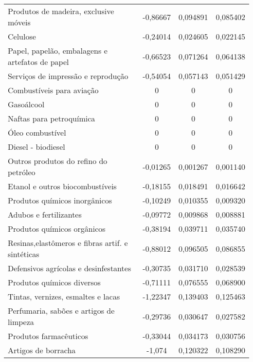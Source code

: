 \begin{apendicesenv}
\begin{small}
\begin{center}
\begin{longtable}{m{8cm}ccc}
				Produtos de madeira, exclusive móveis              & -0,86667 & 0,094891 & 0,085402 \\
				Celulose                                           & -0,24014 & 0,024605 & 0,022145 \\
				Papel, papelão, embalagens e artefatos de papel    & -0,66523 & 0,071264 & 0,064138 \\
				Serviços de impressão e reprodução                 & -0,54054 & 0,057143 & 0,051429 \\
				Combustíveis para aviação                          & 0 & 0 & 0 \\
				Gasoálcool                                         & 0 & 0 & 0 \\
				Naftas para petroquímica                           & 0 & 0 & 0 \\
				Óleo combustível                                   & 0 & 0 & 0 \\
				Diesel - biodiesel                                 & 0 & 0 & 0 \\
				Outros produtos do refino do petróleo              & -0,01265 & 0,001267 & 0,001140 \\
				Etanol e outros   biocombustíveis                  & -0,18155 & 0,018491 & 0,016642 \\
				Produtos químicos inorgânicos                      & -0,10249 & 0,010355 & 0,009320 \\
				Adubos e fertilizantes                             & -0,09772 & 0,009868 & 0,008881 \\
				Produtos químicos orgânicos                        & -0,38194 & 0,039711 & 0,035740 \\
				Resinas,elastômeros e fibras artif. e sintéticas   & -0,88012 & 0,096505 & 0,086855 \\
				Defensivos agrícolas e desinfestantes              & -0,30735 & 0,031710 & 0,028539 \\
				Produtos químicos diversos                         & -0,71111 & 0,076555 & 0,068900 \\
				Tintas, vernizes, esmaltes e lacas                 & -1,22347 & 0,139403 & 0,125463 \\
				Perfumaria, sabões e artigos de limpeza            & -0,29736 & 0,030647 & 0,027582 \\
				Produtos farmacêuticos                             & -0,33044 & 0,034173 & 0,030756 \\
				Artigos de borracha                                & -1,074 & 0,120322 & 0,108290 \\

\end{longtable}
\end{center}
\end{small}
\end{apendicesenv}
